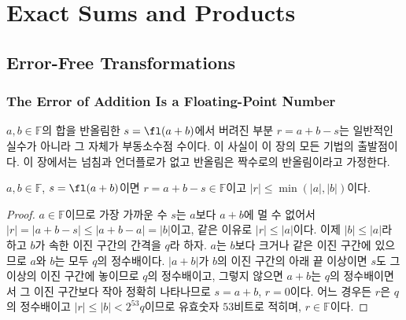 \chapter{Exact Sums and Products}
\label{ch:exact-sums}


\section{Error-Free Transformations}
\label{sec:eft}

\subsection{The Error of Addition Is a Floating-Point Number}

$a,b\in\mathbb F$의 합을 반올림한 $s=\fl(a+b)$에서 버려진 부분 $r=a+b-s$는 일반적인 실수가 아니라 그 자체가 부동소수점 수이다. 이 사실이 이 장의 모든 기법의 출발점이다. 이 장에서는 넘침과 언더플로가 없고 반올림은 짝수로의 반올림이라고 가정한다.

\begin{lemma}
\label{lem:add-error}
$a,b\in\mathbb F$, $s=\fl(a+b)$이면 $r=a+b-s\in\mathbb F$이고 $|r|\le\min(|a|,|b|)$이다.
\end{lemma}

\begin{proof}
$a\in\mathbb F$이므로 가장 가까운 수 $s$는 $a$보다 $a+b$에 멀 수 없어서 $|r|=|a+b-s|\le|a+b-a|=|b|$이고, 같은 이유로 $|r|\le|a|$이다. 이제 $|b|\le|a|$라 하고 $b$가 속한 이진 구간의 간격을 $q$라 하자. $a$는 $b$보다 크거나 같은 이진 구간에 있으므로 $a$와 $b$는 모두 $q$의 정수배이다. $|a+b|$가 $b$의 이진 구간의 아래 끝 이상이면 $s$도 그 이상의 이진 구간에 놓이므로 $q$의 정수배이고, 그렇지 않으면 $a+b$는 $q$의 정수배이면서 그 이진 구간보다 작아 정확히 나타나므로 $s=a+b$, $r=0$이다. 어느 경우든 $r$은 $q$의 정수배이고 $|r|\le|b|<2^{53}q$이므로 유효숫자 $53$비트로 적히며, $r\in\mathbb F$이다.
\end{proof}

